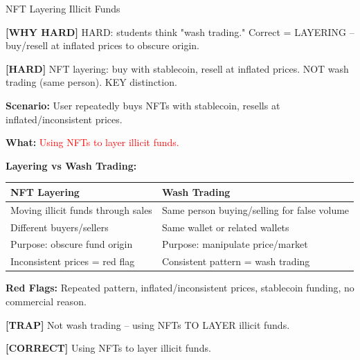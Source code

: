 \documentclass[6pt,aspectratio=169,fontsize=5pt]{beamer}
\renewcommand{\tiny}{\fontsize{3.5pt}{4.5pt}\selectfont}
\renewcommand{\normalsize}{\fontsize{7.5pt}{8.5pt}\selectfont}
\newcommand{\trap}[1]{%
	\begin{block}{\textcolor{redtrap}{\textbf{[TRAP]}}}
		\textcolor{redtrap}{\tiny #1}
	\end{block}
}
\newcommand{\correct}[1]{%
	\begin{block}{\textcolor{greencorrect}{\textbf{[CORRECT]}}}
		\textcolor{greencorrect}{\tiny #1}
	\end{block}
}
\newcommand{\hard}[1]{%
	\begin{block}{\textcolor{hardcolor}{\textbf{[HARD]}}}
		\textcolor{hardcolor}{\tiny #1}
	\end{block}
}
\newcommand{\hardexplain}[1]{%
	\begin{block}{\textcolor{orangehard}{\textbf{[WHY HARD]}}}
		\textcolor{orangehard}{\tiny #1}
	\end{block}
}
\begin{document}
	\begin{frame}{\normalsize NFT Layering Illicit Funds}
		
		\hardexplain{HARD: students think "wash trading." Correct = LAYERING -- buy/resell at inflated prices to obscure origin.}
		
		\hard{NFT layering: buy with stablecoin, resell at inflated prices. NOT wash trading (same person). KEY distinction.}
		
		\textbf{Scenario:} User repeatedly buys NFTs with stablecoin, resells at inflated/inconsistent prices.
		
		\textbf{What:} \textcolor{red}{Using NFTs to layer illicit funds.}
		
		\textbf{Layering vs Wash Trading:}
		\begin{table}
			\begin{tabular}{|p{3.8cm}|p{3.8cm}|}
				\hline
				\textbf{NFT Layering} & \textbf{Wash Trading} \\
				\hline
				Moving illicit funds through sales & Same person buying/selling for false volume \\
				\hline
				Different buyers/sellers & Same wallet or related wallets \\
				\hline
				Purpose: obscure fund origin & Purpose: manipulate price/market \\
				\hline
				Inconsistent prices = red flag & Consistent pattern = wash trading \\
				\hline
			\end{tabular}
		\end{table}
		
		\textbf{Red Flags:} Repeated pattern, inflated/inconsistent prices, stablecoin funding, no commercial reason.
		
		\trap{Not wash trading -- using NFTs TO LAYER illicit funds.}
		
		\correct{Using NFTs to layer illicit funds.}
	\end{frame}
	
\end{document}

